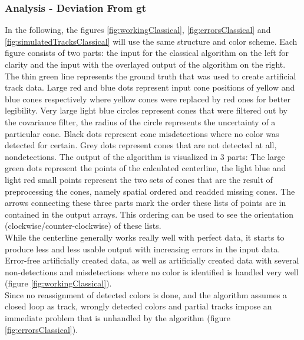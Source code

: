 \subsubsection{Analysis - Deviation From \ac{gt}}
In the following, the figures \ref{fig:workingClassical}, \ref{fig:errorsClassical} and \ref{fig:simulatedTracksClassical} will use the same structure and color scheme. Each figure consists of two parts: the input for the classical algorithm on the left for clarity and the input with the overlayed output of the algorithm on the right. The thin green line represents the ground truth that was used to create artificial track data. Large red and blue dots represent input cone positions of yellow and blue cones respectively where yellow cones were replaced by red ones for better legibility. Very large light blue circles represent cones that were filtered out by the covariance filter, the radius of the circle represents the uncertainty of a particular cone. Black dots represent cone misdetections where no color was detected for certain. Grey dots represent cones that are not detected at all, nondetections. The output of the algorithm is visualized in 3 parts: The large green dots represent the points of the calculated centerline, the light blue and light red small points represent the two sets of cones that are the result of preprocessing the cones, namely spatial ordered and readded missing cones. The arrows connecting these three parts mark the order these lists of points are in contained in the output arrays. This ordering can be used to see the orientation (clockwise/counter-clockwise) of these lists. 
\\
While the centerline generally works really well with perfect data, it starts to produce less and less usable output with increasing errors in the input data. Error-free artificially created data, as well as artificially created data with several non-detections and misdetections where no color is identified is handled very well (figure \ref{fig:workingClassical}). \\
Since no reassignment of detected colors is done, and the algorithm assumes a closed loop as track, wrongly detected colors and partial tracks impose an immediate problem that is unhandled by the algorithm (figure \ref{fig:errorsClassical}).
